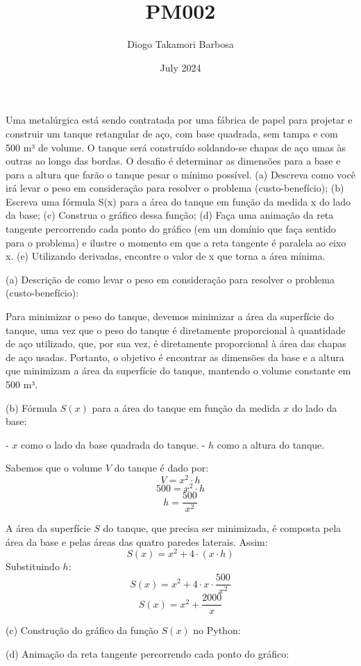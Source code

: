 \documentclass{article}
\title{PM002}
\author{Diogo Takamori Barbosa}
\date{July 2024}
\begin{document}
\maketitle
Uma metalúrgica está sendo contratada por uma fábrica de papel para projetar e construir um tanque retangular de aço, com base quadrada, sem tampa e com 500 m³ de volume. O tanque será construído soldando-se chapas de aço umas às outras ao longo das bordas. O desafio é determinar as dimensões para a base e para a altura que farão o tanque pesar o mínimo possível.
(a) Descreva como você irá levar o peso em consideração para resolver o problema (custo-benefício);
(b) Escreva uma fórmula S(x) para a  área do tanque em função da medida x do lado da base;
(c) Construa o gráfico dessa função;
(d) Faça uma animação da reta tangente percorrendo cada ponto do gráfico (em um domínio que faça sentido para o problema) e ilustre o momento em que a reta tangente é paralela ao eixo x.
(e) Utilizando derivadas, encontre o valor de x que torna a área mínima.

(a) Descrição de como levar o peso em consideração para resolver o problema (custo-benefício):

Para minimizar o peso do tanque, devemos minimizar a área da superfície do tanque, uma vez que o peso do tanque é diretamente proporcional à quantidade de aço utilizado, que, por sua vez, é diretamente proporcional à área das chapas de aço usadas. Portanto, o objetivo é encontrar as dimensões da base e a altura que minimizam a área da superfície do tanque, mantendo o volume constante em 500 m³.

(b) Fórmula \( S(x) \) para a área do tanque em função da medida \( x \) do lado da base:

- \( x \) como o lado da base quadrada do tanque.
- \( h \) como a altura do tanque.

Sabemos que o volume \( V \) do tanque é dado por:
\[ V = x^2 \cdot h \]
\[ 500 = x^2 \cdot h \]
\[ h = \frac{500}{x^2} \]

A área da superfície \( S \) do tanque, que precisa ser minimizada, é composta pela área da base e pelas áreas das quatro paredes laterais. Assim:
\[ S(x) = x^2 + 4 \cdot (x \cdot h) \]
Substituindo \( h \):
\[ S(x) = x^2 + 4 \cdot x \cdot \frac{500}{x^2} \]
\[ S(x) = x^2 + \frac{2000}{x} \]

(c) Construção do gráfico da função \( S(x) \) no Python:



(d) Animação da reta tangente percorrendo cada ponto do gráfico:
\end{document}
